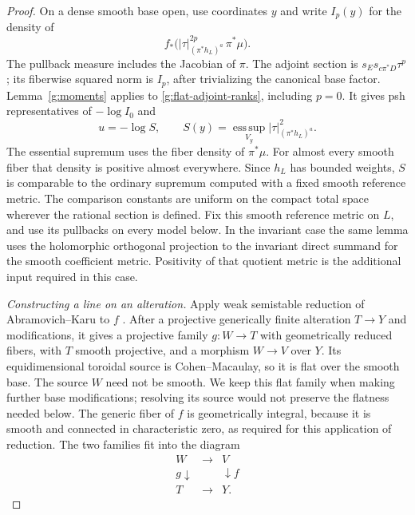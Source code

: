 \begin{proof}
On a dense smooth base open, use coordinates \(y\) and write \(I_p(y)\)
for the density of
\[
              f_*\bigl(|\tau|_{(\pi^*h_L)^a}^{2p}\,\pi^*\mu\bigr).
\]
The pullback measure includes the Jacobian of \(\pi\).  The adjoint
section is \(s_Es_{c\pi^*D}\tau^p\); its fiberwise squared norm is
\(I_p\), after trivializing the canonical base factor.
Lemma~\ref{g:moments} applies to
\eqref{g:flat-adjoint-ranks}, including \(p=0\).  It gives psh
representatives of \(-\log I_0\) and
\begin{equation}
 u=-\log S,\qquad
 S(y)=\operatorname*{ess\,sup}_{V_y}|\tau|^2_{(\pi^*h_L)^a}.
 \label{g:flat-limit-norm}
\end{equation}
The essential supremum uses the fiber density of \(\pi^*\mu\).
For almost every smooth fiber that density is positive almost everywhere.
Since \(h_L\) has bounded weights, \(S\) is comparable to the ordinary
supremum computed with a fixed smooth reference metric.  The comparison
constants are uniform on the compact total space wherever the rational
section is defined. Fix this smooth reference metric on \(L\), and use
its pullbacks on every model below. In the invariant case the same lemma uses
the holomorphic orthogonal projection to the invariant direct summand
for the smooth coefficient metric.  Positivity of that quotient metric
is the additional input required in this case.

\emph{Constructing a line on an alteration.}
Apply weak semistable reduction of Abramovich--Karu to \(f\)
\cite[Theorem~0.3 and Definition~0.1, arXiv version~1]{AK2000}.  After a projective generically finite
alteration \(T\to Y\) and modifications, it gives a projective family
\(g:W\to T\) with geometrically reduced fibers, with \(T\) smooth
projective, and a morphism \(W\to V\) over \(Y\).  Its equidimensional
toroidal source is Cohen--Macaulay, so it is flat over the smooth base.
The source \(W\) need not be smooth.  We keep this flat family when
making further base modifications; resolving its source would not
preserve the flatness needed below.  The generic fiber of \(f\) is
geometrically integral, because it is smooth and connected in
characteristic zero, as required for this application of reduction.
The two families fit into the diagram
\[
 \begin{array}{ccc}
 W&\longrightarrow&V\\
 {\scriptstyle g}\downarrow&&\downarrow{\scriptstyle f}\\
 T&\longrightarrow&Y.
 \end{array}
\]


\end{proof}
